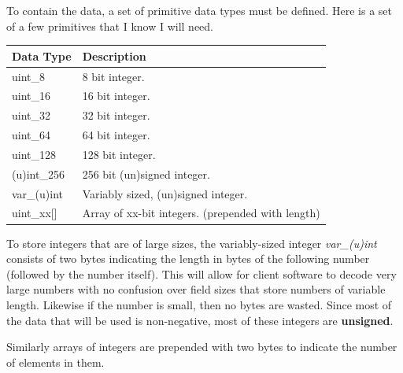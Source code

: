 \documentclass{article}
\begin{document}
To contain the data, a set of primitive data types must be defined. Here is a set of a few primitives that I know I will need.
\begin{table}[h]
\centering
\begin{tabular}{|l|p{8.5cm}|}
\hline
\rowcolor{tblgrey} 
Data Type  & Description                \\ \hline
uint\_8     & 8 bit integer.            \\ \hline
uint\_16    & 16 bit integer.           \\ \hline
uint\_32    & 32 bit integer.           \\ \hline
uint\_64    & 64 bit integer.           \\ \hline
uint\_128   & 128 bit integer.          \\ \hline
(u)int\_256   & 256 bit (un)signed integer.          \\ \hline
var\_(u)int   & Variably sized, (un)signed integer.    \\ \hline
uint\_xx[\hspace{0.05cm}] & Array of xx-bit integers. (prepended with length) \\ \hline
\end{tabular}
\end{table}

To store integers that are of large sizes, the variably-sized integer \textit{var\_(u)int} consists of two bytes indicating the length in bytes of the following number (followed by the number itself). This will allow for client software to decode very large numbers with no confusion over field sizes that store numbers of variable length. Likewise if the number is small, then no bytes are wasted. Since most of the data that will be used is non-negative, most of these integers are \textbf{unsigned}.

Similarly arrays of integers are prepended with two bytes to indicate the number of elements in them.
\end{document}
